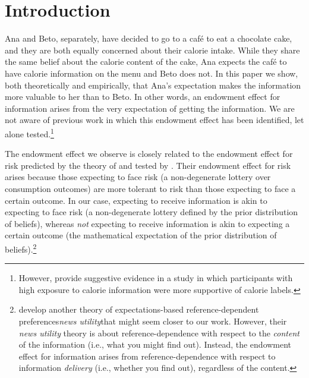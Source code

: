 \documentclass[12pt]{article}
\begin{document}
\clearpage


\section{Introduction}

Ana and Beto, separately, have decided to go to a café to eat a chocolate cake, and they are both equally concerned about their calorie intake. While they share the same belief about the calorie content of the cake, Ana expects the café to have calorie information on the menu and Beto does not. In this paper we show, both theoretically and empirically, that Ana’s expectation makes the information more valuable to her than to Beto.  In other words, an endowment effect for information arises from the very expectation of getting the information. We are not aware of previous work in which this endowment effect has been identified, let alone tested.\footnote{However, \citet{cawleyImpactInformationDisclosure} provide suggestive evidence in a study in which participants with high exposure to calorie information were more supportive of calorie labels.}

The endowment effect we observe is closely related to the endowment effect for risk predicted by the theory of \citet{koszegiReferenceDependentRiskAttitudes2007} and tested by \citet{sprengerEndowmentEffectRisk2015}. Their endowment effect for risk arises because those expecting to face risk (a non-degenerate lottery over consumption outcomes) are more tolerant to risk than those expecting to face a certain outcome. In our case, expecting to receive information is akin to expecting to face risk (a non-degenerate lottery defined by the prior distribution of beliefs), whereas \emph{not} expecting to receive information is akin to expecting a certain outcome (the mathematical expectation of the prior distribution of beliefs).\footnote{\citet{koszegiReferenceDependentConsumptionPlans2009} develop another theory of expectations-based reference-dependent preferences\textemdash\emph{news utility}\textemdash that might seem closer to our work. However, their \emph{news utility} theory is about reference-dependence with respect to the \emph{content} of the information (i.e., what you might find out). Instead, the endowment effect for information arises from reference-dependence with respect to information \emph{delivery} (i.e., whether you find out), regardless of the content.}
\end{document}
